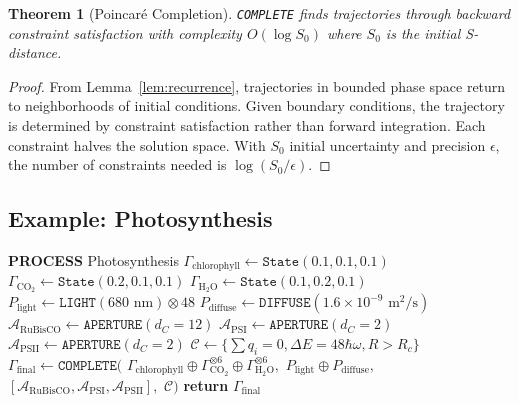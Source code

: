 \documentclass[aps,prd,twocolumn,superscriptaddress,floatfix,nofootinbib]{revtex4-2}
\newtheorem{theorem}{Theorem}[section]
\theoremstyle{remark}
\newcommand{\Pop}{P}
\newcommand{\Gstate}{\Gamma}
\begin{document}
\begin{theorem}[Poincar\'{e} Completion]
\label{thm:poincare}
\texttt{COMPLETE} finds trajectories through backward constraint satisfaction with complexity $O(\log S_0)$ where $S_0$ is the initial S-distance.
\end{theorem}

\begin{proof}
From Lemma~\ref{lem:recurrence}, trajectories in bounded phase space return to neighborhoods of initial conditions. Given boundary conditions, the trajectory is determined by constraint satisfaction rather than forward integration. Each constraint halves the solution space. With $S_0$ initial uncertainty and precision $\epsilon$, the number of constraints needed is $\log(S_0/\epsilon)$.
\end{proof}

\subsection{Example: Photosynthesis}

\begin{algorithm}
\caption{Photosynthesis in CPL}
\label{alg:photosynthesis}
\begin{algorithmic}[1]
\State \textbf{PROCESS} Photosynthesis
\State
\State {}
\State $\Gstate_{\text{chlorophyll}} \gets \texttt{State}(0.1, 0.1, 0.1)$
\State $\Gstate_{\text{CO}_2} \gets \texttt{State}(0.2, 0.1, 0.1)$
\State $\Gstate_{\text{H}_2\text{O}} \gets \texttt{State}(0.1, 0.2, 0.1)$
\State
\State {}
\State $\Pop_{\text{light}} \gets \texttt{LIGHT}(680\text{ nm}) \otimes 48$
\State $\Pop_{\text{diffuse}} \gets \texttt{DIFFUSE}(1.6 \times 10^{-9}\text{ m}^2/\text{s})$
\State
\State {}
\State $\mathcal{A}_{\text{RuBisCO}} \gets \texttt{APERTURE}(d_C = 12)$
\State $\mathcal{A}_{\text{PSI}} \gets \texttt{APERTURE}(d_C = 2)$
\State $\mathcal{A}_{\text{PSII}} \gets \texttt{APERTURE}(d_C = 2)$
\State
\State {}
\State $\mathcal{C} \gets \{\sum q_i = 0, \Delta E = 48\hbar\omega, R > R_c\}$
\State
\State {}
\State $\Gstate_{\text{final}} \gets \texttt{COMPLETE}($
\State \quad $\Gstate_{\text{chlorophyll}} \oplus \Gstate_{\text{CO}_2}^{\otimes 6} \oplus \Gstate_{\text{H}_2\text{O}}^{\otimes 6},$
\State \quad $\Pop_{\text{light}} \oplus \Pop_{\text{diffuse}},$
\State \quad $[\mathcal{A}_{\text{RuBisCO}}, \mathcal{A}_{\text{PSI}}, \mathcal{A}_{\text{PSII}}],$
\State \quad $\mathcal{C})$
\State
\State {}
\State \textbf{return} $\Gstate_{\text{final}}$ \Comment{$= \Gstate_{\text{glucose}} \oplus \Gstate_{\text{O}_2}^{\otimes 6}$}
\end{algorithmic}
\end{algorithm}
\end{document}
